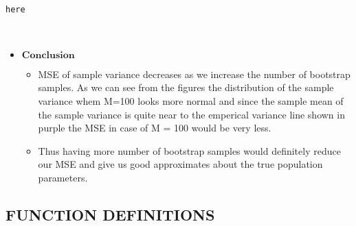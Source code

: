 \documentclass[11pt]{article}
\providecommand{\tightlist}{%
      \setlength{\itemsep}{0pt}\setlength{\parskip}{0pt}}
\begin{document}
    \begin{center}
    \end{center}
    { \hspace*{\fill} \\}
    
    \begin{Verbatim}[commandchars=\\\{\}]
here

    \end{Verbatim}

    \begin{center}
    \end{center}
    { \hspace*{\fill} \\}
    
    \begin{itemize}
\tightlist
\item
  \(\textbf{Conclusion}\)

  \begin{itemize}
  \item
    MSE of sample variance decreases as we increase the number of
    bootstrap samples. As we can see from the figures the distribution
    of the sample variance whem M=100 looks more normal and since the
    sample mean of the sample variance is quite near to the emperical
    variance line shown in purple the MSE in case of M = 100 would be
    very less.
  \item
    Thus having more number of bootstrap samples would definitely reduce
    our MSE and give us good approximates about the true population
    parameters.
  \end{itemize}
\end{itemize}

    \subsection{FUNCTION DEFINITIONS}\label{function-definitions}
\end{document}
